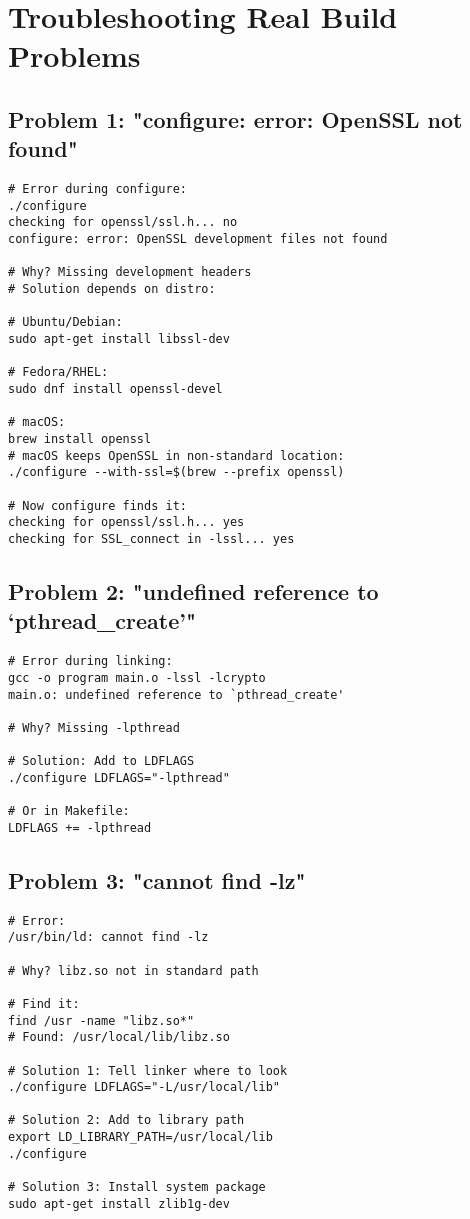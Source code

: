 \section{Troubleshooting Real Build Problems}

\subsection{Problem 1: "configure: error: OpenSSL not found"}

\begin{lstlisting}
# Error during configure:
./configure
checking for openssl/ssl.h... no
configure: error: OpenSSL development files not found

# Why? Missing development headers
# Solution depends on distro:

# Ubuntu/Debian:
sudo apt-get install libssl-dev

# Fedora/RHEL:
sudo dnf install openssl-devel

# macOS:
brew install openssl
# macOS keeps OpenSSL in non-standard location:
./configure --with-ssl=$(brew --prefix openssl)

# Now configure finds it:
checking for openssl/ssl.h... yes
checking for SSL_connect in -lssl... yes
\end{lstlisting}

\subsection{Problem 2: "undefined reference to `pthread\_create'"}

\begin{lstlisting}
# Error during linking:
gcc -o program main.o -lssl -lcrypto
main.o: undefined reference to `pthread_create'

# Why? Missing -lpthread

# Solution: Add to LDFLAGS
./configure LDFLAGS="-lpthread"

# Or in Makefile:
LDFLAGS += -lpthread
\end{lstlisting}

\subsection{Problem 3: "cannot find -lz"}

\begin{lstlisting}
# Error:
/usr/bin/ld: cannot find -lz

# Why? libz.so not in standard path

# Find it:
find /usr -name "libz.so*"
# Found: /usr/local/lib/libz.so

# Solution 1: Tell linker where to look
./configure LDFLAGS="-L/usr/local/lib"

# Solution 2: Add to library path
export LD_LIBRARY_PATH=/usr/local/lib
./configure

# Solution 3: Install system package
sudo apt-get install zlib1g-dev
\end{lstlisting}


